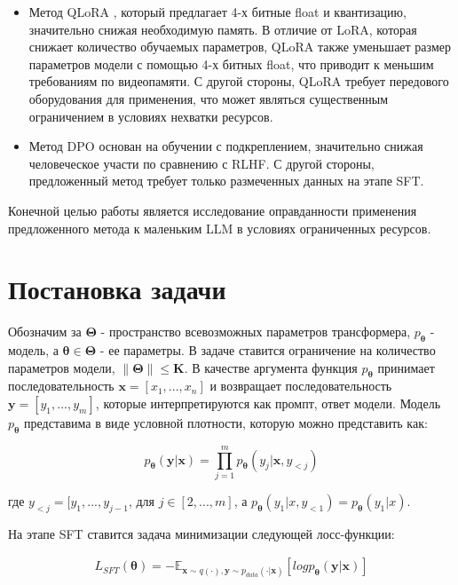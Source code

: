 \documentclass[12pt, twoside]{article}
\newcommand{\bx}{\mathbf{x}}
\newcommand{\by}{\mathbf{y}}
\newcommand{\btheta}{\boldsymbol{\theta}}
\newcommand{\bTheta}{\boldsymbol{\Theta}}
\newcommand{\EE}{\mathbb{E}}
\begin{document}
\begin{itemize}[label={}]
  \item Метод QLoRA \parencite{Dettmers2023}, который предлагает 4-х битные float и квантизацию, значительно снижая необходимую память. В отличие от LoRA, которая снижает количество обучаемых параметров, QLoRA также уменьшает размер параметров модели с помощью 4-х битных float, что приводит к меньшим требованиям по видеопамяти. С другой стороны, QLoRA требует передового оборудования для применения, что может являться существенным ограничением в условиях нехватки ресурсов. 

  \vspace{8}
  
  \item Метод DPO \parencite{Rafailov2023a} основан на обучении с подкреплением, значительно снижая человеческое участи по сравнению с RLHF. С другой стороны, предложенный метод требует только размеченных данных на этапе SFT.
\end{itemize}

Конечной целью работы является исследование оправданности применения предложенного метода к маленьким LLM в условиях ограниченных ресурсов.

\vspace{10}

\section{Постановка задачи}

Обозначим за $\bTheta$ - пространство всевозможных параметров трансформера, $p_{\btheta}$ - модель, а $\btheta \in \bTheta$ -  ее параметры. В задаче ставится ограничение на количество параметров модели,  $\|\bTheta\| \le \mathbf{K}$. В качестве аргумента функция $p_{\btheta}$ принимает последовательность $\bx = [x_1, ..., x_n]$ и возвращает последовательность $\by=[y_1, ..., y_m]$, которые интерпретируются как промпт, ответ модели. Модель $p_{\btheta}$ представима в виде условной плотности, которую можно представить как:

$$p_{\btheta}(\by|\bx) = \prod_{j=1}^m p_{\btheta}(y_j|\bx, y_{<j})$$

где $y_{<j} = [y_1, ..., y_{j-1}$, для $j \in [2, ..., m]$, а $p_{\btheta}(y_1|x, y_{<1}) = p_{\btheta}(y_1|x)$.

На этапе SFT ставится задача минимизации следующей лосс-функции:

\begin{align}
    L_{SFT}(\btheta) = -\EE_{\bx \sim q(\cdot), \by \sim p_{data}(\cdot|\bx)}[log p_{\btheta}(\by|\bx)]
\end{align}
\end{document}
